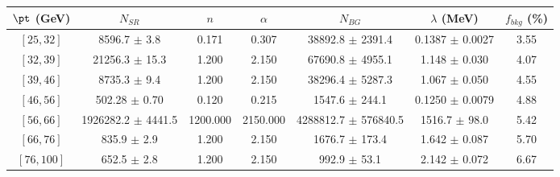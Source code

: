 \begin{tabular}{c||c|c|c|c|c||c}
$\pt$ (GeV) & $N_{SR}$ & $n$ & $\alpha$ & $N_{BG}$  & $\lambda$ (MeV) & $f_{bkg}$ (\%) \\
\hline
$[25, 32]$ & 8596.7 $\pm$ 3.8 & 0.171 & 0.307 & 38892.8 $\pm$ 2391.4 & 0.1387 $\pm$ 0.0027 & 3.55\\
$[32, 39]$ & 21256.3 $\pm$ 15.3 & 1.200 & 2.150 & 67690.8 $\pm$ 4955.1 & 1.148 $\pm$ 0.030 & 4.07\\
$[39, 46]$ & 8735.3 $\pm$ 9.4 & 1.200 & 2.150 & 38296.4 $\pm$ 5287.3 & 1.067 $\pm$ 0.050 & 4.55\\
$[46, 56]$ & 502.28 $\pm$ 0.70 & 0.120 & 0.215 & 1547.6 $\pm$ 244.1 & 0.1250 $\pm$ 0.0079 & 4.88\\
$[56, 66]$ & 1926282.2 $\pm$ 4441.5 & 1200.000 & 2150.000 & 4288812.7 $\pm$ 576840.5 & 1516.7 $\pm$ 98.0 & 5.42\\
$[66, 76]$ & 835.9 $\pm$ 2.9 & 1.200 & 2.150 & 1676.7 $\pm$ 173.4 & 1.642 $\pm$ 0.087 & 5.70\\
$[76, 100]$ & 652.5 $\pm$ 2.8 & 1.200 & 2.150 & 992.9 $\pm$ 53.1 & 2.142 $\pm$ 0.072 & 6.67\\
\end{tabular}
